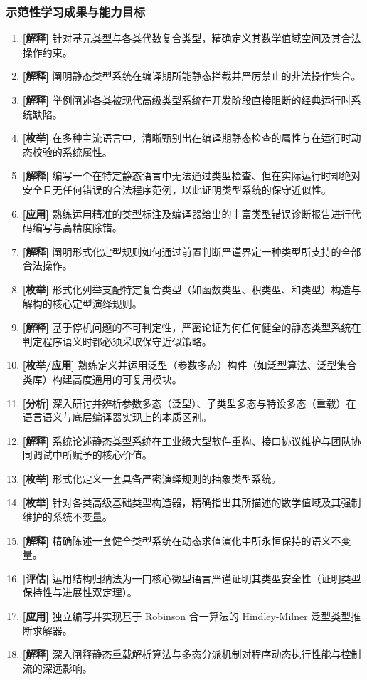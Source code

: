 \subsubsection{示范性学习成果与能力目标}
\begin{enumerate}
    \item \textbf{[解释]} 针对基元类型与各类代数复合类型，精确定义其数学值域空间及其合法操作约束。
    \item \textbf{[解释]} 阐明静态类型系统在编译期所能静态拦截并严厉禁止的非法操作集合。
    \item \textbf{[解释]} 举例阐述各类被现代高级类型系统在开发阶段直接阻断的经典运行时系统缺陷。
    \item \textbf{[枚举]} 在多种主流语言中，清晰甄别出在编译期静态检查的属性与在运行时动态校验的系统属性。
    \item \textbf{[解释]} 编写一个在特定静态语言中无法通过类型检查、但在实际运行时却绝对安全且无任何错误的合法程序范例，以此证明类型系统的保守近似性。
    \item \textbf{[应用]} 熟练运用精准的类型标注及编译器给出的丰富类型错误诊断报告进行代码编写与高精度除错。
    \item \textbf{[解释]} 阐明形式化定型规则如何通过前置判断严谨界定一种类型所支持的全部合法操作。
    \item \textbf{[枚举]} 形式化列举支配特定复合类型（如函数类型、积类型、和类型）构造与解构的核心定型演绎规则。
    \item \textbf{[解释]} 基于停机问题的不可判定性，严密论证为何任何健全的静态类型系统在判定程序语义时都必须采取保守近似策略。
    \item \textbf{[枚举/应用]} 熟练定义并运用泛型（参数多态）构件（如泛型算法、泛型集合类库）构建高度通用的可复用模块。
    \item \textbf{[分析]} 深入研讨并辨析参数多态（泛型）、子类型多态与特设多态（重载）在语言语义与底层编译器实现上的本质区别。
    \item \textbf{[解释]} 系统论述静态类型系统在工业级大型软件重构、接口协议维护与团队协同调试中所赋予的核心价值。
    \item \textbf{[枚举]} 形式化定义一套具备严密演绎规则的抽象类型系统。
    \item \textbf{[枚举]} 针对各类高级基础类型构造器，精确指出其所描述的数学值域及其强制维护的系统不变量。
    \item \textbf{[解释]} 精确陈述一套健全类型系统在动态求值演化中所永恒保持的语义不变量。
    \item \textbf{[评估]} 运用结构归纳法为一门核心微型语言严谨证明其类型安全性（证明类型保持性与进展性双定理）。
    \item \textbf{[应用]} 独立编写并实现基于 Robinson 合一算法的 Hindley-Milner 泛型类型推断求解器。
    \item \textbf{[解释]} 深入阐释静态重载解析算法与多态分派机制对程序动态执行性能与控制流的深远影响。
\end{enumerate}

